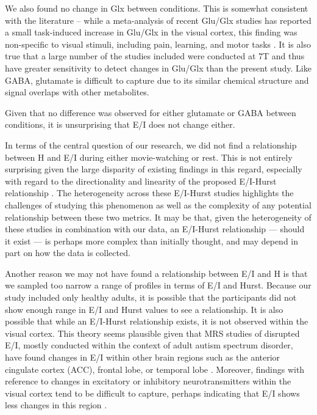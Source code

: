 \documentclass[
true
]{sn-jnl}
\begin{document}
We also found no change in Glx between conditions. This is somewhat
consistent with the literature -- while a meta-analysis of recent
Glu/Glx studies has reported a small task-induced increase in Glu/Glx in
the visual cortex, this finding was non-specific to visual stimuli,
including pain, learning, and motor tasks
\citep{pasantaFunctionalMRSStudies2023}. It is also true that a large
number of the studies included were conducted at 7T and thus have
greater sensitivity to detect changes in Glu/Glx than the present study.
Like GABA, glutamate is difficult to capture due to its similar chemical
structure and signal overlaps with other metabolites.

Given that no difference was observed for either glutamate or GABA
between conditions, it is unsurprising that E/I does not change either.

In terms of the central question of our research, we did not find a
relationship between H and E/I during either movie-watching or rest.
This is not entirely surprising given the large disparity of existing
findings in this regard, especially with regard to the directionality
and linearity of the proposed E/I-Hurst relationship
\citep{liangExcitationInhibitionBalance2024, poilCriticalStateDynamicsAvalanches2012, lombardiBalanceExcitationInhibition2017, baumgartenCriticalExcitationinhibitionBalance2019, bruiningMeasurementExcitationinhibitionRatio2020, trakoshisIntrinsicExcitationinhibitionImbalance, gaoInferringSynapticExcitation2017}.
The heterogeneity across these E/I-Hurst studies highlights the
challenges of studying this phenomenon as well as the complexity of any
potential relationship between these two metrics. It may be that, given
the heterogeneity of these studies in combination with our data, an
E/I-Hurst relationship --- should it exist --- is perhaps more complex
than initially thought, and may depend in part on how the data is
collected.

Another reason we may not have found a relationship between E/I and H is
that we sampled too narrow a range of profiles in terms of E/I and
Hurst. Because our study included only healthy adults, it is possible
that the participants did not show enough range in E/I and Hurst values
to see a relationship. It is also possible that while an E/I-Hurst
relationship exists, it is not observed within the visual cortex. This
theory seems plausible given that MRS studies of disrupted E/I, mostly
conducted within the context of adult autism spectrum disorder, have
found changes in E/I within other brain regions such as the anterior
cingulate cortex (ACC), frontal lobe, or temporal lobe
\citep{ajramContribution1HMagnetic2019}. Moreover, findings with
reference to changes in excitatory or inhibitory neurotransmitters
within the visual cortex tend to be difficult to capture, perhaps
indicating that E/I shows less changes in this region
\citep{pasantaFunctionalMRSStudies2023}.
\end{document}
